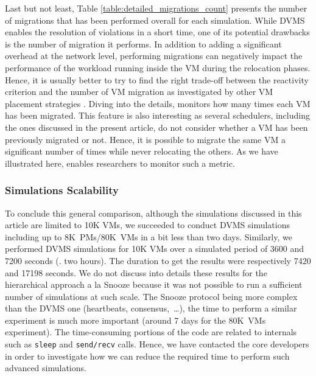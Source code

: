 Last but not least, Table \ref{table:detailed_migrations_count}
presents the number of migrations that has been performed overall for
each simulation. While DVMS enables the resolution of violations in a
short time, one of its potential drawbacks is the number of migration
it performs. In addition to adding a significant overhead at the
network level, performing migrations can negatively impact the
performance of the workload running inside the VM during the
relocation phases. Hence, it is usually better to try to find the
right trade-off between the reactivity criterion and the number of VM
migration as investigated by other VM placement strategies
\cite{eyraud:ipdps2013}. Diving into the details, \vmps monitors how
many times each VM has been migrated. This feature is also interesting as
several schedulers, including the ones discussed in the present
article, do not consider whether a VM has been previously migrated or
not.
Hence, it is possible to migrate the same VM a significant number
of times while never relocating the others. As we have illustrated
here, \vmps enables researchers to monitor such a metric.

\subsubsection{Simulations Scalability}
To conclude this general comparison, although the simulations discussed in this article are
limited to 10K VMs, we succeeded to conduct DVMS simulations including
up to 8K~PMs/80K~VMs in a bit less than two days.
Similarly, we performed DVMS simulations for 10K VMs over a simulated period of
3600 and 7200 seconds (\ie. two hours). The duration to get the
results were respectively 7420 and 17198 seconds.
We do not discuss into details these results for the hierarchical
approach a la Snooze because it was not possible to run a
sufficient number of simulations at such scale. The Snooze
protocol being more complex than the DVMS one (heartbeats,
consensus,~\ldots), the time to perform a similar experiment is much
more important (around 7 days for the 80K~VMs experiment). The time-consuming portions of the
code are related to \sg internals such as \texttt{sleep} and
\texttt{send/recv} calls. Hence, we have contacted the \sg core
developers in order to investigate how we can reduce the required time
to perform such advanced simulations.

